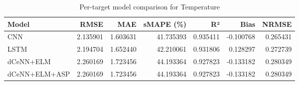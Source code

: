 \begin{table}
\caption{Per-target model comparison for Temperature}
\begin{tabular}{lrrrrrr}
\toprule
Model & RMSE & MAE & sMAPE (\%) & R² & Bias & NRMSE \\
\midrule
CNN & 2.135901 & 1.603631 & 41.735393 & 0.935411 & -0.100768 & 0.265431 \\
LSTM & 2.194704 & 1.652440 & 42.210061 & 0.931806 & 0.128297 & 0.272739 \\
dCeNN+ELM & 2.260169 & 1.723456 & 44.193364 & 0.927823 & -0.133182 & 0.280349 \\
dCeNN+ELM+ASP & 2.260169 & 1.723456 & 44.193364 & 0.927823 & -0.133182 & 0.280349 \\
\bottomrule
\end{tabular}
\end{table}
